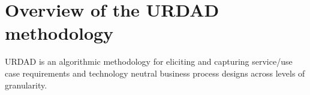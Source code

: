 \section{Overview of the URDAD methodology}

URDAD is an algorithmic methodology for eliciting and capturing service/use case requirements and
technology neutral business process designs across levels of granularity.